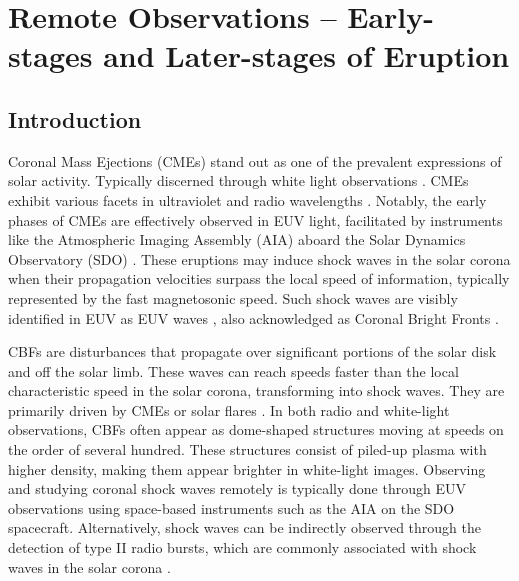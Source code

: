 \chapter{Remote Observations -- Early-stages and Later-stages of Eruption}
\label{chapter2}

\section{Introduction}
Coronal Mass Ejections (CMEs) stand out as one of the prevalent expressions of solar activity. Typically discerned through white light observations \citep{vourlidas_2003, zhang_2006, bein_2011}. CMEs exhibit various facets in ultraviolet and radio wavelengths \citep{bastian_2001, veronig_2010}. Notably, the early phases of CMEs are effectively observed in EUV light, facilitated by instruments like the Atmospheric Imaging Assembly (AIA) aboard the Solar Dynamics Observatory (SDO) \citep{lemen_2011, pesnell_2012}. These eruptions may induce shock waves in the solar corona when their propagation velocities surpass the local speed of information, typically represented by the fast magnetosonic speed. Such shock waves are visibly identified in EUV as EUV waves \citep{thompson_1998}, also acknowledged as Coronal Bright Fronts \citep[CBFs]{long_2011}.

CBFs are disturbances that propagate over significant portions of the solar disk and off the solar limb. These waves can reach speeds faster than the local characteristic speed in the solar corona, transforming into shock waves. They are primarily driven by CMEs or solar flares \citep{thompson_1998, veronig_2010, vrsnak_2008, magdaleni_2010, nindos_2011}. In both radio and white-light observations, CBFs often appear as dome-shaped structures moving at speeds on the order of several hundred\kms \citep{pick_2006, nindos_2008, thompson_2009}. These structures consist of piled-up plasma with higher density, making them appear brighter in white-light images.
Observing and studying coronal shock waves remotely is typically done through EUV observations using space-based instruments such as the AIA on the SDO spacecraft. Alternatively, shock waves can be indirectly observed through the detection of type II radio bursts, which are commonly associated with shock waves in the solar corona \citep{vrsnak_2008}.

